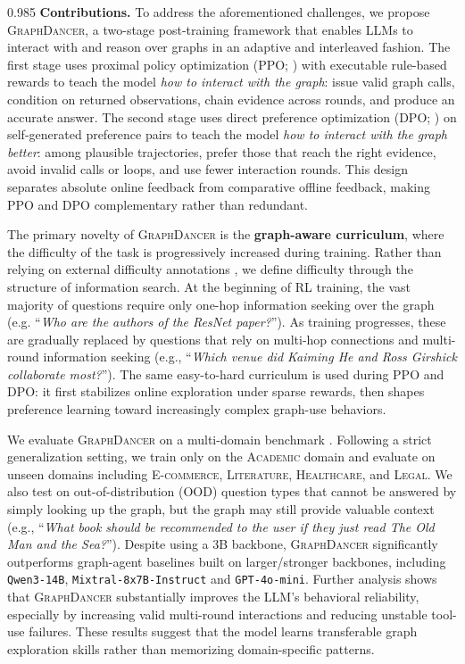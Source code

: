 \documentclass[11pt]{article}
\newcommand{\ours}{\textsc{GraphDancer}\xspace}
\begin{document}
\begin{spacing}{0.985}
\smallskip
\noindent \textbf{Contributions.}
To address the aforementioned challenges, we propose \ours, a two-stage post-training framework that enables LLMs to interact with and reason over graphs in an adaptive and interleaved fashion.
The first stage uses proximal policy optimization (PPO; \citealp{schulman2017proximal}) with executable rule-based rewards to teach the model \emph{how to interact with the graph}: issue valid graph calls, condition on returned observations, chain evidence across rounds, and produce an accurate answer.
The second stage uses direct preference optimization (DPO; \citealp{rafailov2023direct}) on self-generated preference pairs to teach the model \emph{how to interact with the graph better}: among plausible trajectories, prefer those that reach the right evidence, avoid invalid calls or loops, and use fewer interaction rounds.
This design separates absolute online feedback from comparative offline feedback, making PPO and DPO complementary rather than redundant.

The primary novelty of \ours is the \textbf{graph-aware curriculum}, where the difficulty of the task is progressively increased during training.
Rather than relying on external difficulty annotations \cite{parashar2025curriculum}, we define difficulty through the structure of information search.
At the beginning of RL training, the vast majority of questions require only one-hop information seeking over the graph (e.g. ``\textit{Who are the authors of the ResNet paper?}''). As training progresses, these are gradually replaced by questions that rely on multi-hop connections and multi-round information seeking (e.g., ``\textit{Which venue did Kaiming He and Ross Girshick collaborate most?}'').
The same easy-to-hard curriculum is used during PPO and DPO: it first stabilizes online exploration under sparse rewards, then shapes preference learning toward increasingly complex graph-use behaviors.

We evaluate \ours on a multi-domain benchmark \cite{jin2024graph}.
Following a strict generalization setting, we train only on the \textsc{Academic} domain and evaluate on unseen domains including \textsc{E-commerce}, \textsc{Literature}, \textsc{Healthcare}, and \textsc{Legal}.
We also test on out-of-distribution (OOD) question types that cannot be answered by simply looking up the graph, but the graph may still provide valuable context (e.g., ``\textit{What book should be recommended to the user if they just read The Old Man and the Sea?}'').
Despite using a 3B backbone, \ours significantly outperforms graph-agent baselines built on larger/stronger backbones, including \texttt{Qwen3-14B}, \texttt{Mixtral-8x7B-Instruct} and \texttt{GPT-4o-mini}.
Further analysis shows that \ours substantially improves the LLM's behavioral reliability, especially by increasing valid multi-round interactions and reducing unstable tool-use failures.
These results suggest that the model learns transferable graph exploration skills rather than memorizing domain-specific patterns.


\end{spacing}
\end{document}
